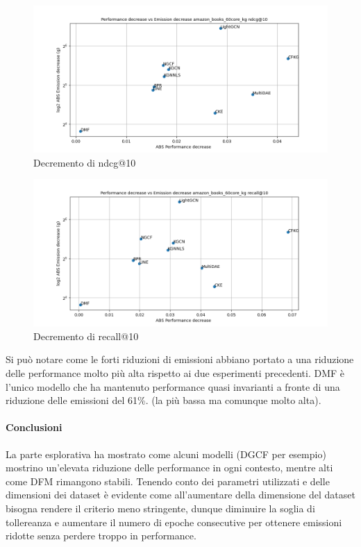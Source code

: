 \begin{figure}[H]
    \centering
     \includegraphics[width=\textwidth]{images/decrement_ndcg@10_amazon_books_60core_kg.png}
    \caption{Decremento di ndcg@10}
\end{figure}

\begin{figure}[H]
    \centering
     \includegraphics[width=\textwidth]{images/decrement_recall@10_amazon_books_60core_kg.png}
    \caption{Decremento di recall@10}
\end{figure}
\noindent Si può notare come le forti riduzioni di emissioni abbiano portato a una riduzione delle performance molto più alta rispetto ai due esperimenti precedenti.
DMF è l'unico modello che ha mantenuto performance quasi invarianti a fronte di una riduzione delle emissioni del 61\%. (la più bassa ma comunque molto alta).

\paragraph{Conclusioni} La parte esplorativa ha mostrato come alcuni modelli (DGCF per esempio) mostrino un'elevata riduzione delle performance in ogni contesto, mentre alti come DFM rimangono stabili.
Tenendo conto dei parametri utilizzati e delle dimensioni dei dataset è evidente come all'aumentare della dimensione del dataset bisogna rendere il criterio meno stringente, dunque diminuire la soglia di tollereanza e aumentare il numero di epoche consecutive per ottenere emissioni ridotte senza perdere troppo in performance.



